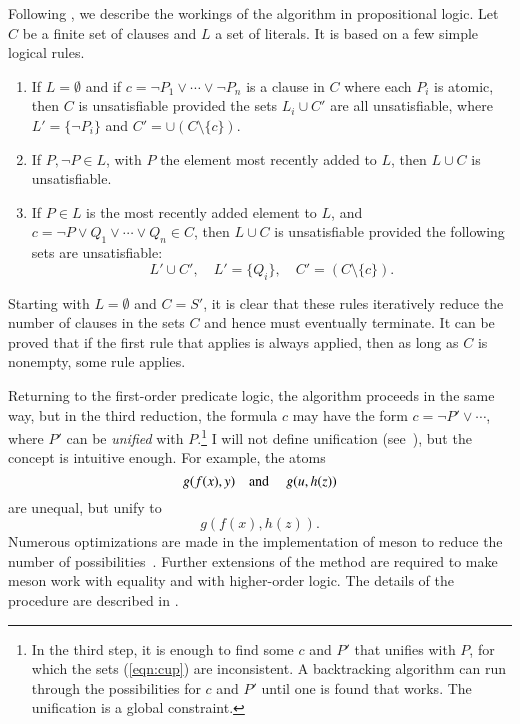 \documentclass{llncs}
\begin{document}
Following \cite{Ha09}, we describe the workings of the algorithm in propositional
logic.  Let  $C$ be a finite set of clauses and $L$ a set of literals.
It is based on a few simple logical rules.
\begin{enumerate}
\item If $L=\emptyset$ and if $c = \lnot P_1 \lor \cdots\lor \lnot
  P_n$ is a clause in $C$ where each $P_i$ is atomic, then $C$ is
  unsatisfiable provided the sets $L_i\cup C'$ are all unsatisfiable,
  where $L' =\{\lnot P_i\}$ and $C'= \cup (C\setminus \{c\})$.
\item If $P,\lnot P\in L$, with $P$ the element most recently added to $L$,
then $L\cup C$
is unsatisfiable.
\item If $P\in L$ is the most recently added element to $L$, and
  $c=\lnot P \lor Q_1 \lor \cdots\lor Q_n\in C$, then $L\cup C$ is
  unsatisfiable provided the following sets are unsatisfiable:
\begin{equation}\label{eqn:cup}
L' \cup C',\quad L'=\{Q_i\},\quad C' = (C\setminus \{c\}).
\end{equation}
\end{enumerate}
Starting with $L=\emptyset$ and $C=S'$, 
it is clear that these rules iteratively 
reduce the number of clauses in the sets $C$ and
hence must eventually terminate.  It can be proved that if the first rule
that applies is always applied, then as long as $C$ is nonempty, some rule
applies.



Returning to the first-order predicate logic, the algorithm proceeds
in the same way, but in the third reduction, the formula $c$ may have
the form $c=\lnot P' \lor \cdots$, where $P'$ can be {\it unified}
with $P$.\footnote{In the third step, it is enough to find some $c$
  and $P'$ that unifies with $P$, for which the sets (\ref{eqn:cup})
  are inconsistent.  A backtracking algorithm can run through the
  possibilities for $c$ and $P'$ until one is found that works.  The
  unification is a global constraint.}  I will not define unification
(see~\cite{Ha09}), but the concept is intuitive enough.  For
example, the atoms
\[
g(f(x),y) \text{\quad and \quad} g(u,h(z))
\]
are unequal, but unify to
\[
g(f(x),h(z)).
\]
Numerous optimizations are made in the implementation of meson to
reduce the number of possibilities~\cite{harrison:meson}.  
Further extensions of the method are required to make meson work with
equality and with higher-order logic.  
The details of the 
procedure are described in \cite[Sec.~3.15]{Ha09}.
\end{document}
